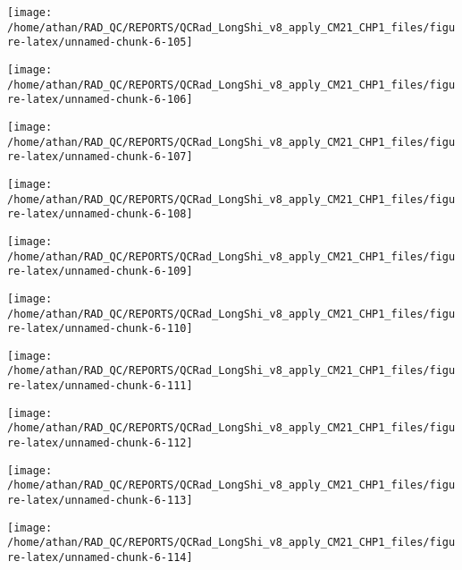 \documentclass[
  10pt,
  a4paper,oneside]{article}
\begin{document}
\begin{center}\texttt{[image: /home/athan/RAD\_QC/REPORTS/QCRad\_LongShi\_v8\_apply\_CM21\_CHP1\_files/figure-latex/unnamed-chunk-6-105]} \end{center}

\begin{center}\texttt{[image: /home/athan/RAD\_QC/REPORTS/QCRad\_LongShi\_v8\_apply\_CM21\_CHP1\_files/figure-latex/unnamed-chunk-6-106]} \end{center}

\begin{center}\texttt{[image: /home/athan/RAD\_QC/REPORTS/QCRad\_LongShi\_v8\_apply\_CM21\_CHP1\_files/figure-latex/unnamed-chunk-6-107]} \end{center}

\begin{center}\texttt{[image: /home/athan/RAD\_QC/REPORTS/QCRad\_LongShi\_v8\_apply\_CM21\_CHP1\_files/figure-latex/unnamed-chunk-6-108]} \end{center}

\begin{center}\texttt{[image: /home/athan/RAD\_QC/REPORTS/QCRad\_LongShi\_v8\_apply\_CM21\_CHP1\_files/figure-latex/unnamed-chunk-6-109]} \end{center}

\begin{center}\texttt{[image: /home/athan/RAD\_QC/REPORTS/QCRad\_LongShi\_v8\_apply\_CM21\_CHP1\_files/figure-latex/unnamed-chunk-6-110]} \end{center}

\begin{center}\texttt{[image: /home/athan/RAD\_QC/REPORTS/QCRad\_LongShi\_v8\_apply\_CM21\_CHP1\_files/figure-latex/unnamed-chunk-6-111]} \end{center}

\begin{center}\texttt{[image: /home/athan/RAD\_QC/REPORTS/QCRad\_LongShi\_v8\_apply\_CM21\_CHP1\_files/figure-latex/unnamed-chunk-6-112]} \end{center}

\begin{center}\texttt{[image: /home/athan/RAD\_QC/REPORTS/QCRad\_LongShi\_v8\_apply\_CM21\_CHP1\_files/figure-latex/unnamed-chunk-6-113]} \end{center}

\begin{center}\texttt{[image: /home/athan/RAD\_QC/REPORTS/QCRad\_LongShi\_v8\_apply\_CM21\_CHP1\_files/figure-latex/unnamed-chunk-6-114]} \end{center}
\end{document}
